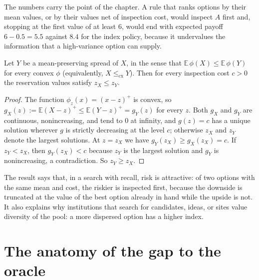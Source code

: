 The numbers carry the point of the chapter. A rule that ranks options by their mean values, or by their values net of inspection cost, would inspect $A$ first and, stopping at the first value of at least $6$, would end with expected payoff $6-0.5=5.5$ against $8.4$ for the index policy, because it undervalues the information that a high-variance option can supply.

\begin{newresult}\label{prop:spread}
Let $Y$ be a mean-preserving spread of $X$, in the sense that $\mathbb E\,\phi(X)\le\mathbb E\,\phi(Y)$ for every convex $\phi$ (equivalently, $X\le_{\mathrm{cx}}Y$). Then for every inspection cost $c>0$ the reservation values satisfy $z_X\le z_Y$.
\end{newresult}
\begin{proof}
The function $\phi_z(x)=(x-z)^+$ is convex, so $g_X(z):=\mathbb E(X-z)^+\le\mathbb E(Y-z)^+=g_Y(z)$ for every $z$. Both $g_X$ and $g_Y$ are continuous, nonincreasing, and tend to $0$ at infinity, and $g(z)=c$ has a unique solution wherever $g$ is strictly decreasing at the level $c$; otherwise $z_X$ and $z_Y$ denote the largest solutions. At $z=z_X$ we have $g_Y(z_X)\ge g_X(z_X)=c$. If $z_Y<z_X$, then $g_Y(z_X)<c$ because $z_Y$ is the largest solution and $g_Y$ is nonincreasing, a contradiction. So $z_Y\ge z_X$.
\end{proof}

The result says that, in a search with recall, risk is attractive: of two options with the same mean and cost, the riskier is inspected first, because the downside is truncated at the value of the best option already in hand while the upside is not. It also explains why institutions that search for candidates, ideas, or sites value diversity of the pool: a more dispersed option has a higher index.

\section{The anatomy of the gap to the oracle}\label{sec:gap}

